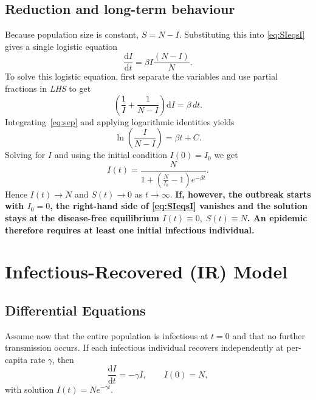 \documentclass[11pt]{article}
\begin{document}
\subsection*{Reduction and long-term behaviour}
Because population size is constant, \(S = N - I\).
Substituting this into \cref{eq:SIeqsI} gives a single logistic equation 
\[
\frac{\mathrm{d}I}{\mathrm{d}t} = \beta I \frac{(N-I)}{N}
.\]
To solve this logistic equation, first separate the variables and use partial fractions in \emph{LHS} to get
\begin{equation}\label{eq:sep}
\left ( \frac{1}{I} + \frac{1}{N-I} \right ) \mathrm{d}I = \beta \, dt. 
\end{equation}
Integrating~\cref{eq:sep} and applying logarithmic identities yields
\[
\ln \left ( \frac{I}{N-I} \right )= \beta t + C.
\]
Solving for \(I\) and using the initial condition \(I(0) = I_0\) we get
\[
I(t) = \frac{N}{1+\left (\frac{N}{I_0}-1\right)e^{-\beta t}}
.\]
Hence \(I(t)\to N\) and \(S(t)\to 0\) as \(t\to\infty\).
\textbf{If, however, the outbreak starts with \(I_0 = 0\), the right-hand side of \eqref{eq:SIeqsI} vanishes and the solution stays at the disease-free equilibrium \(I(t)\equiv0,\;S(t)\equiv N\).  An epidemic therefore requires at least one initial infectious individual.}

\section{Infectious-Recovered (IR) Model}\label{sec:IR}
\subsection*{Differential Equations}
Assume now that the entire population is infectious at \(t=0\) and that no further
transmission occurs.  
If each infectious individual recovers independently at per-capita rate
\(\gamma\), then
\begin{equation*}
\frac{\mathrm{d}I}{\mathrm{d}t} = -\gamma I, \qquad I(0)=N,
\end{equation*}
with solution \(I(t)=N e^{-\gamma t}\). 
\end{document}
